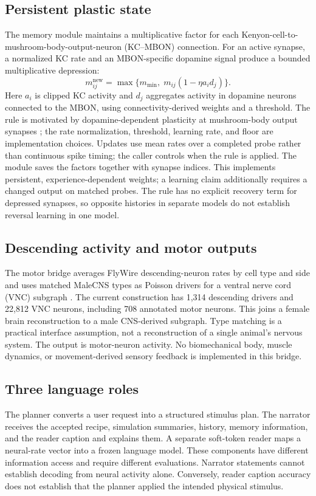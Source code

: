 \subsection{Persistent plastic state}
The memory module maintains a multiplicative factor for each Kenyon-cell-to-mushroom-body-output-neuron (KC--MBON) connection. For an active synapse, a normalized KC rate and an MBON-specific dopamine signal produce a bounded multiplicative depression:
\begin{equation}
 m_{ij}^{\mathrm{new}}=\max\{m_{\min},\;m_{ij}(1-\eta a_i d_j)\}.
\end{equation}
Here $a_i$ is clipped KC activity and $d_j$ aggregates activity in dopamine neurons connected to the MBON, using connectivity-derived weights and a threshold. The rule is motivated by dopamine-dependent plasticity at mushroom-body output synapses \citep{hige2015}; the rate normalization, threshold, learning rate, and floor are implementation choices. Updates use mean rates over a completed probe rather than continuous spike timing; the caller controls when the rule is applied. The module saves the factors together with synapse indices. This implements persistent, experience-dependent weights; a learning claim additionally requires a changed output on matched probes. The rule has no explicit recovery term for depressed synapses, so opposite histories in separate models do not establish reversal learning in one model.

\subsection{Descending activity and motor outputs}
The motor bridge averages FlyWire descending-neuron rates by cell type and side and uses matched MaleCNS types as Poisson drivers for a ventral nerve cord (VNC) subgraph \citep{malecns2026}. The current construction has 1,314 descending drivers and 22,812 VNC neurons, including 708 annotated motor neurons. This joins a female brain reconstruction to a male CNS-derived subgraph. Type matching is a practical interface assumption, not a reconstruction of a single animal's nervous system. The output is motor-neuron activity. No biomechanical body, muscle dynamics, or movement-derived sensory feedback is implemented in this bridge.

\subsection{Three language roles}
The planner converts a user request into a structured stimulus plan. The narrator receives the accepted recipe, simulation summaries, history, memory information, and the reader caption and explains them. A separate soft-token reader maps a neural-rate vector into a frozen language model. These components have different information access and require different evaluations. Narrator statements cannot establish decoding from neural activity alone. Conversely, reader caption accuracy does not establish that the planner applied the intended physical stimulus.

